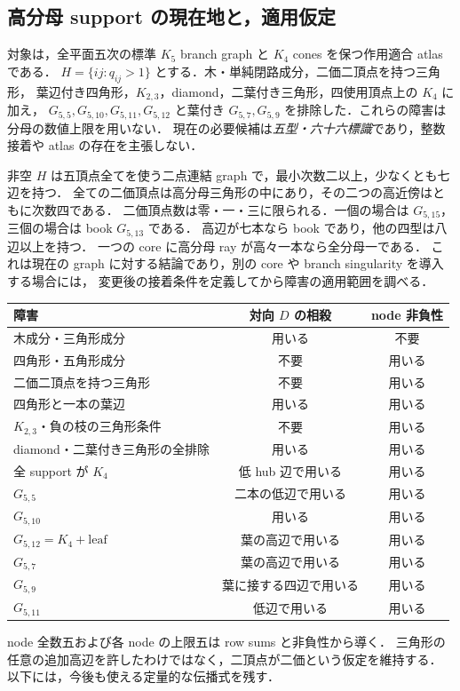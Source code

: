 \subsection{高分母 support の現在地と，適用仮定}
\label{ns19:current-support}

対象は，全平面五次の標準 $K_5$ branch graph と $K_4$ cones を保つ作用適合 atlas である．
$H=\{ij:q_{ij}>1\}$ とする．木・単純閉路成分，二価二頂点を持つ三角形，
葉辺付き四角形，$K_{2,3}$，diamond，二葉付き三角形，四使用頂点上の $K_4$ に加え，
$G_{5,5},G_{5,10},G_{5,11},G_{5,12}$ と葉付き $G_{5,7},G_{5,9}$ を排除した．これらの障害は分母の数値上限を用いない．
現在の必要候補は\emph{五型・六十六標識}であり，整数接着や atlas の存在を主張しない．

非空 $H$ は五頂点全てを使う二点連結 graph で，最小次数二以上，少なくとも七辺を持つ．
全ての二価頂点は高分母三角形の中にあり，その二つの高近傍はともに次数四である．
二価頂点数は零・一・三に限られる．一個の場合は $G_{5,15}$，三個の場合は book $G_{5,13}$ である．
高辺が七本なら book であり，他の四型は八辺以上を持つ．
一つの core に高分母 ray が高々一本なら全分母一である．
これは現在の graph に対する結論であり，別の core や branch singularity を導入する場合には，
変更後の接着条件を定義してから障害の適用範囲を調べる．

\begin{center}
\begin{tabular}{lcc}
障害 & 対向 $D$ の相殺 & node 非負性\\\hline
木成分・三角形成分 & 用いる & 不要\\
四角形・五角形成分 & 不要 & 用いる\\
二価二頂点を持つ三角形 & 不要 & 用いる\\
四角形と一本の葉辺 & 用いる & 用いる\\
$K_{2,3}$・負の枝の三角形条件 & 不要 & 用いる\\
diamond・二葉付き三角形の全排除 & 用いる & 用いる\\
全 support が $K_4$ & 低 hub 辺で用いる & 用いる\\
$G_{5,5}$ & 二本の低辺で用いる & 用いる\\
$G_{5,10}$ & 用いる & 用いる\\
$G_{5,12}=K_4+\mathrm{leaf}$ & 葉の高辺で用いる & 用いる\\
$G_{5,7}$ & 葉の高辺で用いる & 用いる\\
$G_{5,9}$ & 葉に接する四辺で用いる & 用いる\\
$G_{5,11}$ & 低辺で用いる & 用いる
\end{tabular}
\end{center}
node 全数五および各 node の上限五は row sums と非負性から導く．
三角形の任意の追加高辺を許したわけではなく，二頂点が二価という仮定を維持する．
以下には，今後も使える定量的な伝播式を残す．

